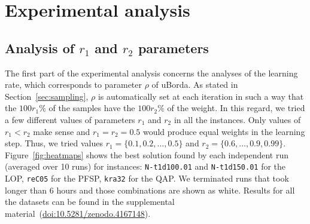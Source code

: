 \documentclass[sigconf,dvipsnames]{acmart}
\newcommand{\supplement}{\href{http://doi.org/10.5281/zenodo.4167148}{doi:10.5281/zenodo.4167148}}
\begin{document}
\section{Experimental analysis}\label{sec:analysis}

\subsection{Analysis of $r_1$ and $r_2$ parameters}

The first part of the experimental analysis concerns the {analyses} of the learning rate, which corresponds to parameter $\rho$ of uBorda. As stated in Section~\ref{sec:sampling}, $\rho$ is automatically set at each iteration in such a way that the $100r_1\%$ of the samples have the $100r_2\%$ of the weight. In this regard, we tried a few different values of parameters $r_1$ and $r_2$ in all the instances. Only values of $r_1 < r_2$ make sense and $r_1 = r_2 = 0.5$ would produce equal weights in the learning step. Thus, we tried values $r_1 = \{0.1, 0.2, \dotsc, 0.5\}$ and $r_2 = \{0.6,\dotsc, 0.9, 0.99\}$. Figure~\ref{fig:heatmaps} shows the best solution found by each independent run (averaged over 10 runs) for instances: \texttt{N-t1d100.01} and \texttt{N-t1d150.01} for the LOP, \texttt{reC05} for the PFSP, \texttt{kra32} for the QAP. We terminated runs that took longer than 6 hours and those combinations are shown as white.  Results for all the datasets can be found in the supplemental material~(\supplement).
\end{document}
